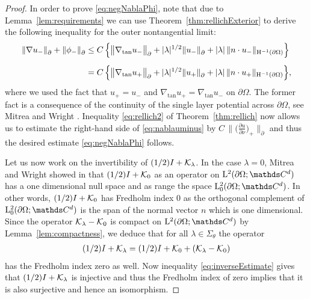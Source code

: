 \begin{proof}
  In order to prove \eqref{eq:negNablaPhi}, note that due to Lemma~\ref{lem:requirements} we can use Theorem~\ref{thm:rellichExterior} to derive the following inequality for the outer nontangential limit:
  \begin{align}
    \|\nabla u_-\|^{}_\partial + \|\phi_-\|^{}_\partial
    &\leq C\, \Big\{ \big\|\nabla_{\mathrm{tan}} u_- \big\|^{}_\partial + |\lambda|^{1/2} \| u_-\|^{}_\partial + |\lambda|\, \| n \cdot u_-\|_{\mathrm{H}^{-1}(\partial\Omega)} \Big\} \nonumber\\[0.5em]
    \label{eq:nablauminus}
    &= C \, \Big\{ \big\|\nabla_{\mathrm{tan}} u_+ \big\|^{}_\partial + |\lambda|^{1/2} \| u_+ \|^{}_\partial + |\lambda|\, \|n \cdot u_+ \|_{\mathrm{H}^{-1}(\partial\Omega)} \Big\},
  \end{align}
  where we used the fact that $u_+ = u_-$ and $\nabla_{\mathrm{tan}} u_+ = \nabla_{\mathrm{tan}} u_-$ on $\partial\Omega$. The former fact is a consequence of the continuity of the single layer potential across $\partial\Omega$, see Mitrea and Wright \cite[Prop.\@~4.7]{mitreaWright}.
  Inequality \eqref{eq:rellich2} of Theorem~\ref{thm:rellich} now allows us to estimate the right-hand side of \eqref{eq:nablauminus} by $C \,\|\big(\frac{\partial u}{\partial \nu} \big)_+ \|^{}_\partial$ and thus the desired estimate \eqref{eq:negNablaPhi} follows.

  Let us now work on the invertibility of $(1/2) I + \mathcal{K}_\lambda$. In the case $\lambda = 0$, Mitrea and Wright showed in \cite[Eq.\@~(5.166)]{mitreaWright} that $(1/2) I + \mathcal{K}_0$ as an operator on $\Ell^2(\partial\Omega; \C^d)$ has a one dimensional null space and as range the space $\Ell_0^2(\partial\Omega; \C^d)$.
  In other words, $(1/2) I + \mathcal{K}_0$ has Fredholm index $0$ as the orthogonal complement of $\Ell^2_0(\partial\Omega; \C^d)$ is the span of the normal vector $n$ which is one dimensional.
  Since the operator $\mathcal{K}_\lambda - \mathcal{K}_0$ is compact on $\Ell^2(\partial\Omega; \C^d)$ by Lemma~\ref{lem:compactness}, we deduce that for all $\lambda \in \Sigma_\theta$ the operator
  \begin{align*}
    (1/2)I + \mathcal{K}_\lambda = (1/2)I + \mathcal{K}_0 + (\mathcal{K}_\lambda - \mathcal{K}_0)
  \end{align*}
  has the Fredholm index zero as well.
  Now inequality \eqref{eq:inverseEstimate} gives that $(1/2)I + \mathcal{K}_\lambda$ is injective and thus the Fredholm index of zero implies that it is also surjective and hence an isomorphism.
\end{proof}

